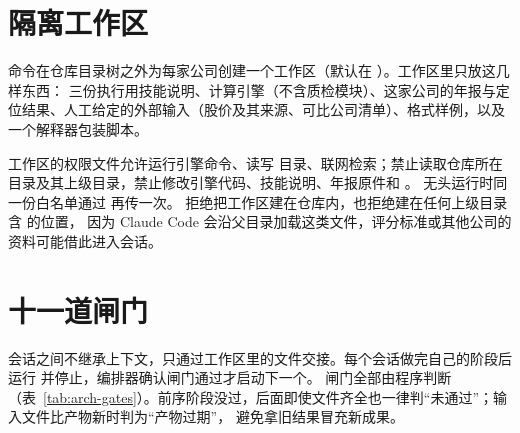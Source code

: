 \section{隔离工作区}

 命令在仓库目录树之外为每家公司创建一个工作区（默认在 ）。工作区里只放这几样东西：
三份执行用技能说明、计算引擎（不含质检模块）、这家公司的年报与定位结果、人工给定的外部输入（股价及其来源、可比公司清单）、格式样例，以及一个解释器包装脚本。

工作区的权限文件允许运行引擎命令、读写  目录、联网检索；禁止读取仓库所在目录及其上级目录，禁止修改引擎代码、技能说明、年报原件和 。
无头运行时同一份白名单通过  再传一次。 拒绝把工作区建在仓库内，也拒绝建在任何上级目录含  的位置，
因为 Claude Code 会沿父目录加载这类文件，评分标准或其他公司的资料可能借此进入会话。

\section{十一道闸门}

会话之间不继承上下文，只通过工作区里的文件交接。每个会话做完自己的阶段后运行  并停止，编排器确认闸门通过才启动下一个。
闸门全部由程序判断（表~\ref{tab:arch-gates}）。前序阶段没过，后面即使文件齐全也一律判“未通过”；输入文件比产物新时判为“产物过期”，
避免拿旧结果冒充新成果。

